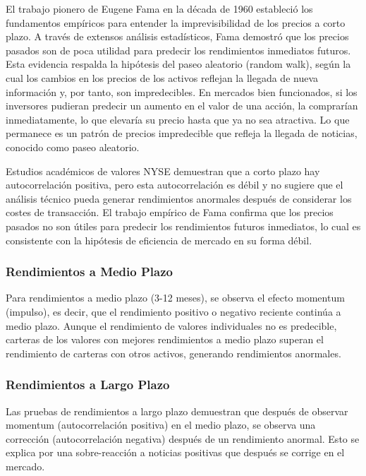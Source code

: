 El trabajo pionero de Eugene Fama en la década de 1960 estableció los fundamentos empíricos para entender la imprevisibilidad de los precios a corto plazo. A través de extensos análisis estadísticos, Fama demostró que los precios pasados son de poca utilidad para predecir los rendimientos inmediatos futuros. Esta evidencia respalda la hipótesis del paseo aleatorio (random walk), según la cual los cambios en los precios de los activos reflejan la llegada de nueva información y, por tanto, son impredecibles. En mercados bien funcionados, si los inversores pudieran predecir un aumento en el valor de una acción, la comprarían inmediatamente, lo que elevaría su precio hasta que ya no sea atractiva. Lo que permanece es un patrón de precios impredecible que refleja la llegada de noticias, conocido como paseo aleatorio.

\begin{proposicion}
Estudios académicos de valores NYSE demuestran que a corto plazo hay autocorrelación positiva, pero esta autocorrelación es débil y no sugiere que el análisis técnico pueda generar rendimientos anormales después de considerar los costes de transacción. El trabajo empírico de Fama confirma que los precios pasados no son útiles para predecir los rendimientos futuros inmediatos, lo cual es consistente con la hipótesis de eficiencia de mercado en su forma débil.
\end{proposicion}

\subsubsection{Rendimientos a Medio Plazo}

Para rendimientos a medio plazo (3-12 meses), se observa el efecto momentum (impulso), es decir, que el rendimiento positivo o negativo reciente continúa a medio plazo. Aunque el rendimiento de valores individuales no es predecible, carteras de los valores con mejores rendimientos a medio plazo superan el rendimiento de carteras con otros activos, generando rendimientos anormales.

\subsubsection{Rendimientos a Largo Plazo}

Las pruebas de rendimientos a largo plazo demuestran que después de observar momentum (autocorrelación positiva) en el medio plazo, se observa una corrección (autocorrelación negativa) después de un rendimiento anormal. Esto se explica por una sobre-reacción a noticias positivas que después se corrige en el mercado.

